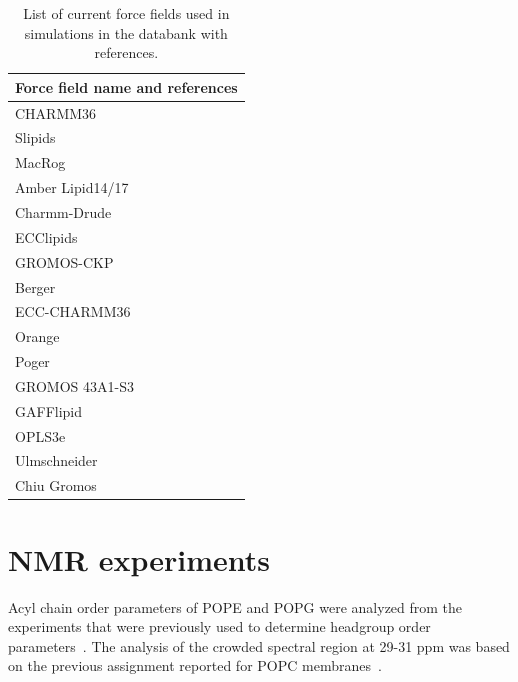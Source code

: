 \documentclass[fleqn,10pt]{wlscirep}
\begin{document}
\begin{table}[p]
    \centering
    \begin{tabular}{l}
    Force field name and references \\
    \hline
    CHARMM36~\cite{klauda10}\\
    Slipids~\cite{jambeck12,jambeck12b,jambeck2012another,ermilova16,grote20}  \\
    MacRog~\cite{Kulig15b}  \\
    Amber Lipid14/17~\cite{dickson14,dickson22}  \\
    Charmm-Drude~\cite{li2017drude}      \\
    ECClipids~\cite{melcr18,melcr20,bacle21}  \\
    GROMOS-CKP~\cite{Chandrasekhar03,kukol09,piggot12}  \\
    Berger~\cite{berger97}  \\
    ECC-CHARMM36~\cite{nencini2019development}  \\
    Orange~\cite{catte16}  \\
    Poger~\cite{poger10}  \\
    GROMOS 43A1-S3~\cite{chiu09}  \\ 
    GAFFlipid~\cite{dickson12}  \\
    OPLS3e~\cite{roos19}  \\
    Ulmschneider~\cite{Ulmschneider09}  \\
    Chiu Gromos~\cite{chiu09}  \\
    \end{tabular}
    \caption{List of current force fields used in simulations in the databank with references.}
    \label{tab:ForceFields}
\end{table}



\clearpage
\section{NMR experiments}
Acyl chain order parameters of POPE and POPG were analyzed from the experiments that were previously used to determine headgroup order parameters~\cite{bacle21}. The analysis of the crowded spectral region at 29-31 ppm was based on the previous assignment reported for POPC membranes~\cite{ferreira13}. 
\end{document}
